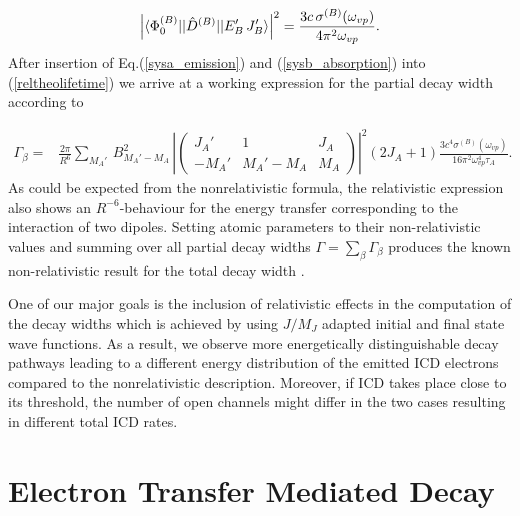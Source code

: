 \begin{equation}\label{sysb_absorption}
  \left| \braket{\Phi_0^{(B)} || \hat{D}^{(B)} || E'_{B}\, J'_{B}} \right|^2
   = \frac{3c\,\sigma^{(B)}(\omega_{vp})}{4\pi^2\omega_{vp}} .
\end{equation}
After insertion of Eq.(\ref{sysa_emission}) and (\ref{sysb_absorption})
into (\ref{reltheolifetime}) we arrive at a working expression for the
partial decay width according to

\begin{align}\label{reltheolifetime_exp}
 \Gamma_\beta =& \frac{2\pi}{R^6} \sum\limits_{M_A'} \, B_{M_A'-M_A}^2 \, \left| \left(
\begin{array}{ccc}
J_A'  & 1        & J_A\\
-M_A' & M_A'-M_A & M_A
\end{array}\right) \right|^2
 (2J_A+1)\frac{3c^4 \sigma^{(B)}(\omega_{vp})}{16\pi^2\omega_{vp}^4\tau_A} .
\end{align}
As could be expected from the nonrelativistic formula, the relativistic
expression also shows an $R^{-6}$-behaviour for the energy transfer
corresponding to the interaction of two dipoles.
Setting atomic parameters to their non-relativistic values and summing
over all partial decay widths 
$\Gamma=\sum\limits_\beta \Gamma_\beta$ produces the known
non-relativistic result for the total decay width \cite{Averbukh04,Gokhberg10_1}.

One of our major goals is the inclusion of relativistic effects in the
computation of the decay widths which is achieved by using $J/M_J$ adapted
initial and final state wave functions. As a result, we observe more
energetically distinguishable decay pathways leading to a different energy
distribution of the emitted ICD electrons compared to the nonrelativistic
description. Moreover, if ICD takes place close to its threshold, the number
of open channels might differ in the two cases resulting in different total
ICD rates.


\section{Electron Transfer Mediated Decay}
\label{subs_etmd}


